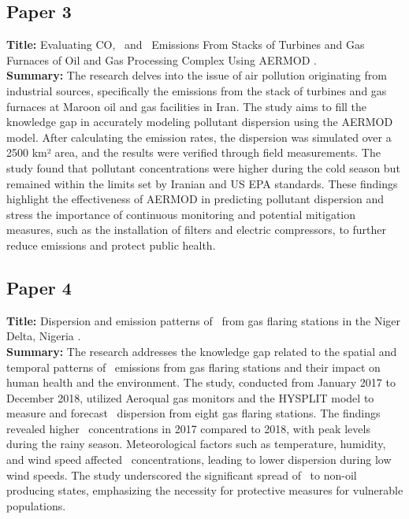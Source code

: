 \subsection*{Paper 3}
\textbf{Title:} Evaluating CO, \NOtwo\, and \SOtwo\ Emissions From Stacks of Turbines and Gas Furnaces of Oil and Gas Processing Complex Using AERMOD \cite{mousavi2022evaluating}.\\
\textbf{Summary:} The research delves into the issue of air pollution originating from industrial sources, specifically the emissions from the stack of turbines and gas furnaces at Maroon oil and gas facilities in Iran. The study aims to fill the knowledge gap in accurately modeling pollutant dispersion using the AERMOD model. After calculating the emission rates, the dispersion was simulated over a 2500 km² area, and the results were verified through field measurements. The study found that pollutant concentrations were higher during the cold season but remained within the limits set by Iranian and US EPA standards. These findings highlight the effectiveness of AERMOD in predicting pollutant dispersion and stress the importance of continuous monitoring and potential mitigation measures, such as the installation of filters and electric compressors, to further reduce emissions and protect public health.


\subsection*{Paper 4}
\textbf{Title:} Dispersion and emission patterns of \NOtwo\ from gas flaring stations in the Niger Delta, Nigeria \cite{nwosisi2020dispersion}.\\
\textbf{Summary:} The research addresses the knowledge gap related to the spatial and temporal patterns of \NOtwo\ emissions from gas flaring stations and their impact on human health and the environment. The study, conducted from January 2017 to December 2018, utilized Aeroqual gas monitors and the HYSPLIT model to measure and forecast \NOtwo\ dispersion from eight gas flaring stations. The findings revealed higher \NOtwo\ concentrations in 2017 compared to 2018, with peak levels during the rainy season. Meteorological factors such as temperature, humidity, and wind speed affected \NOtwo\ concentrations, leading to lower dispersion during low wind speeds. The study underscored the significant spread of \NOtwo\ to non-oil producing states, emphasizing the necessity for protective measures for vulnerable populations.

